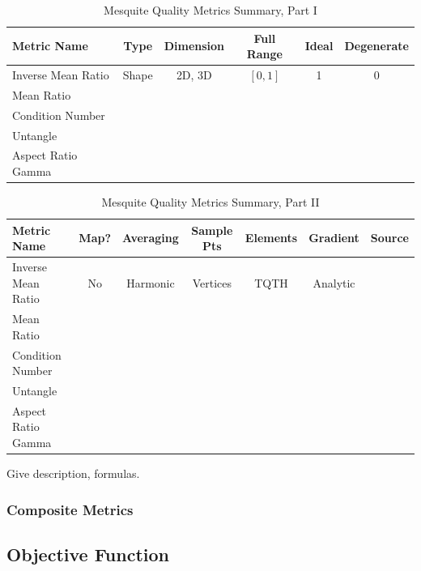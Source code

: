 \begin{table}[h]
\begin{center}
\begin{tabular}{|l|c|c|c|c|c|}
\hline
Metric Name & Type & Dimension & Full Range & Ideal & Degenerate \\ \hline
Inverse Mean Ratio & Shape & 2D, 3D & $[0,1]$ & 1 & 0 \\ 
Mean Ratio &  &  &  &  &  \\ 
Condition Number &  &  &  &  &  \\ 
Untangle &  &  &  &  &  \\ 
Aspect Ratio Gamma &  &  &  &  &  \\ 
\hline
\end{tabular}
\caption{\label{QualityMetrics1} Mesquite Quality Metrics Summary, Part I}
\end{center}
\end{table}

\begin{table}[h]
\begin{center}
\begin{tabular}{|l|c|c|c|c|c|c|}
\hline
Metric Name & Map? & Averaging & Sample Pts & Elements & Gradient & Source \\ \hline
Inverse Mean Ratio & No & Harmonic & Vertices & TQTH & Analytic & \\ 
Mean Ratio &  &  &  &  &  \\ 
Condition Number &  &  &  &  &  \\ 
Untangle &  &  &  &  &  \\ 
Aspect Ratio Gamma &  &  &  &  &  \\ 
\hline
\end{tabular}
\caption{\label{QualityMetrics2} Mesquite Quality Metrics Summary, Part II}
\end{center}
\end{table}

 \newline
Give description, formulas. 

\subsubsection{Composite Metrics}

\subsection{Objective Function} \label{sec:ObjectiveFunction}

